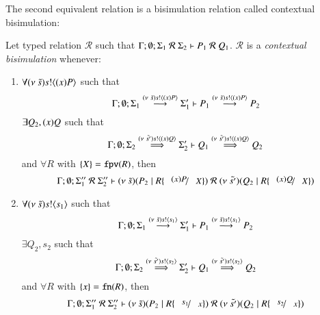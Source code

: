 The second equivalent relation is a bisimulation relation called
contextual bisimulation:
\begin{definition}\rm
	Let typed relation $\mathcal{R}$ such that $\Gamma; \emptyset; \Sigma_1\ \mathcal{R}\ \Sigma_2 \proves P_1\ \mathcal{R}\ Q_1$.
	$\mathcal{R}$ is a {\em contextual bisimulation} whenever:
	\begin{enumerate}
		\item	$\forall (\nu\ \tilde{s}) s ! \langle (x)P \rangle$ such that
			\[
				\Gamma; \emptyset; \Sigma_1 \stackrel{(\nu\ \tilde{s}) s ! \langle (x)P \rangle}{\longrightarrow} \Sigma_1' \vdash P_1 \stackrel{(\nu\ \tilde{s}) s ! \langle (x)P \rangle}{\longrightarrow} P_2
			\]
			$\exists Q_2, (x)Q$ such that
			\[
				\Gamma; \emptyset; \Sigma_2 \stackrel{(\nu\ \tilde{s'}) s ! \langle (x)Q \rangle}{\Longrightarrow} \Sigma_2' \vdash Q_1 \stackrel{(\nu\ \tilde{s'}) s ! \langle (x)Q \rangle}{\Longrightarrow} Q_2
			\]
			and $\forall R$ with $\{X\} = \mathtt{fpv}(R)$, %
			then
			\[
				\Gamma; \emptyset; \Sigma_1''\ \mathcal{R}\ \Sigma_2'' \proves \newsp{\tilde{s}}{P_2 \Par R\subst{(x) P}{X}}\ \mathcal{R}\ 
				\newsp{\tilde{s'}}{Q_2 \Par R\subst{(x) Q}{X}}
			\]
		\item	$\forall (\nu\ \tilde{s}) s ! \langle s_1 \rangle$ such that
			\[
				\Gamma; \emptyset; \Sigma_1 \stackrel{(\nu\ \tilde{s}) s ! \langle s_1 \rangle}{\longrightarrow} \Sigma_1' \vdash P_1 \stackrel{(\nu\ \tilde{s}) s ! \langle s_1 \rangle}{\longrightarrow} P_2
			\]
			$\exists Q_2, s_2$ such that
			\[
				\Gamma; \emptyset; \Sigma_2 \stackrel{(\nu\ \tilde{s'}) s ! \langle s_2 \rangle}{\Longrightarrow} \Sigma_2' \vdash Q_1 \stackrel{(\nu\ \tilde{s'}) s ! \langle s_2 \rangle}{\Longrightarrow} Q_2
			\]
			and $\forall R$ with $\{x\} = \mathtt{fn}(R)$, %
			then
			\[
				\Gamma; \emptyset; \Sigma_1''\ \mathcal{R}\ \Sigma_2'' \proves \newsp{\tilde{s}}{P_2 \Par R \subst{s_1}{x}}\ \mathcal{R}\ 
				\newsp{\tilde{s'}}{Q_2 \Par R \subst{s_2}{x}}
			\]


\end{enumerate}
\end{definition}
